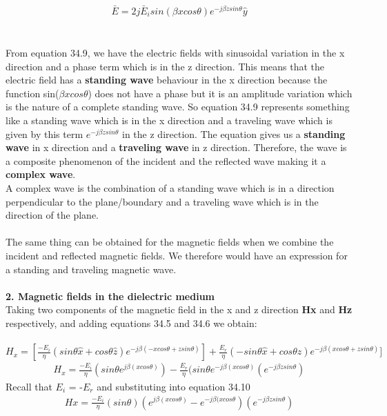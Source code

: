 \\ \begin{align}
\bar{E}=2j \bar{E}_i sin(\beta xcos\theta) e^{-j\beta zsin\theta} \hat{y}
\end{align}
\\\\ From equation 34.9, we have the electric fields with sinusoidal
variation in the x direction and a phase term which is in the z direction. This means that the electric field has a \textbf{standing wave} behaviour in the x direction because the
function {sin({$\beta xcos\theta$})} does not have a phase but it is an amplitude
variation which is the nature of a complete standing wave. So equation 34.9 represents something like a standing
wave which is in the x direction and a traveling wave which is given
by this term \textbf{$e^{-j\beta zsin\theta}$} in the z direction.
The equation gives us a \textbf{standing wave} in x direction and a \textbf{traveling wave} in z direction. Therefore, the wave is a composite phenomenon
of the incident and the reflected wave making it a \textbf{complex wave}.\\ A complex wave is the combination of a standing wave which is in a
direction perpendicular to the plane/boundary and a traveling wave
which is in the direction of the plane.
\\\\ The same thing can be obtained for the magnetic fields when we
combine the incident and reflected magnetic fields. We therefore
would have an expression for a standing and traveling magnetic
wave.
\\\\ \textbf{2. Magnetic fields in the dielectric medium}
\\Taking two components of the magnetic field in the x and z direction
\textbf{Hx} and \textbf{Hz} respectively, and adding equations 34.5 and 34.6 we obtain:
\\\\
$H_x =[ \frac{-E_i}{\eta} (sin\theta \hat{x} + cos\theta \hat{z}) e^{-j\beta( -xcos\theta + zsin\theta)}] + 
\frac{E_r}{\eta} (-sin\theta \hat{x} + cos\theta \hat{z}) e^{-j\beta( xcos\theta + zsin\theta)}]$
\begin{align}
H_x = \frac{-E_i}{\eta}(sin\theta e^{j\beta( xcos\theta)} ) - \frac{E_r}{\eta}(sin\theta e^{-j\beta( xcos\theta)} (e^{-j\beta zsin\theta})
\end{align}
 Recall that $E_i$ = -$E_r$ and substituting into equation 34.10
\begin{align}
Hx = \frac{-E_i}{\eta}(sin\theta)( e^{j\beta( xcos\theta)} - e^{-j\beta( xcos\theta}) (e^{-j\beta zsin\theta})
\end{align}
